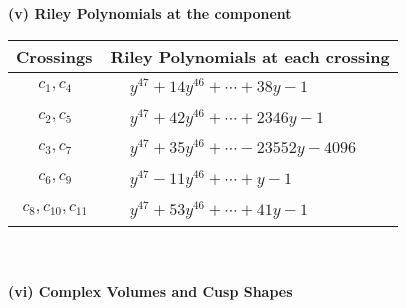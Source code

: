 \documentclass[1p]{elsarticle_modified}
\theoremstyle{definition}
\begin{document}
\newpage\renewcommand{\arraystretch}{1}
\flushleft \textbf{(v) Riley Polynomials at the component}\newline \\
\begin{tabular}{m{50pt}|m{274pt}}
Crossings & \hspace{64pt}Riley Polynomials at each crossing \\
\hline $$\begin{aligned}c_{1},c_{4}\end{aligned}$$&$\begin{aligned}
&y^{47}+14 y^{46}+\cdots+38 y-1
\end{aligned}$\\
\hline $$\begin{aligned}c_{2},c_{5}\end{aligned}$$&$\begin{aligned}
&y^{47}+42 y^{46}+\cdots+2346 y-1
\end{aligned}$\\
\hline $$\begin{aligned}c_{3},c_{7}\end{aligned}$$&$\begin{aligned}
&y^{47}+35 y^{46}+\cdots-23552 y-4096
\end{aligned}$\\
\hline $$\begin{aligned}c_{6},c_{9}\end{aligned}$$&$\begin{aligned}
&y^{47}-11 y^{46}+\cdots+y-1
\end{aligned}$\\
\hline $$\begin{aligned}c_{8},c_{10},c_{11}\end{aligned}$$&$\begin{aligned}
&y^{47}+53 y^{46}+\cdots+41 y-1
\end{aligned}$\\
\hline
\end{tabular}\\~\\
\newpage\flushleft \textbf{(vi) Complex Volumes and Cusp Shapes}
\end{document}
